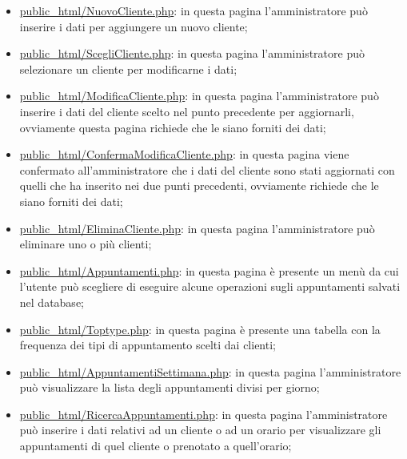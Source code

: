 {\begin{itemize}
		\item \href{http://tecnologie-web.studenti.math.unipd.it/tecweb/~pgabelli/public\_html/NuovoCliente.php}{public\_html/NuovoCliente.php}: in questa pagina l'amministratore può inserire i dati per aggiungere un nuovo cliente;
		\item \href{http://tecnologie-web.studenti.math.unipd.it/tecweb/~pgabelli/public\_html/ScegliCliente.php}{public\_html/ScegliCliente.php}: in questa pagina l'amministratore può selezionare un cliente per modificarne i dati;
		\item \underline{public\_html/ModificaCliente.php}: in questa pagina l'amministratore può inserire i dati del cliente scelto nel punto precedente per aggiornarli, ovviamente questa pagina richiede che le siano forniti dei dati;
		\item \underline{public\_html/ConfermaModificaCliente.php}: in questa pagina viene confermato all'amministratore che i dati del cliente sono stati aggiornati con quelli che ha inserito nei due punti precedenti, ovviamente richiede che le siano forniti dei dati;
		\item \href{http://tecnologie-web.studenti.math.unipd.it/tecweb/~pgabelli/public\_html/EliminaCliente.php}{public\_html/EliminaCliente.php}: in questa pagina l'amministratore può eliminare uno o più clienti;
		\item \href{http://tecnologie-web.studenti.math.unipd.it/tecweb/~pgabelli/public\_html/Appuntamenti.php}{public\_html/Appuntamenti.php}: in questa pagina è presente un menù da cui l'utente può scegliere di eseguire alcune operazioni sugli appuntamenti salvati nel database;
		\item \href{http://tecnologie-web.studenti.math.unipd.it/tecweb/~pgabelli/public\_html/Toptype.php}{public\_html/Toptype.php}: in questa pagina è presente una tabella con la frequenza dei tipi di appuntamento scelti dai clienti;
		\item \href{http://tecnologie-web.studenti.math.unipd.it/tecweb/~pgabelli/public\_html/AppuntamentiSettimana.php}{public\_html/AppuntamentiSettimana.php}: in questa pagina l'amministratore può visualizzare la lista degli appuntamenti divisi per giorno;
		\item \href{http://tecnologie-web.studenti.math.unipd.it/tecweb/~pgabelli/public\_html/RicercaAppuntamenti.php}{public\_html/RicercaAppuntamenti.php}: in questa pagina l'amministratore può inserire i dati relativi ad un cliente o ad un orario per visualizzare gli appuntamenti di quel cliente o prenotato a quell'orario;

\end{itemize}}
